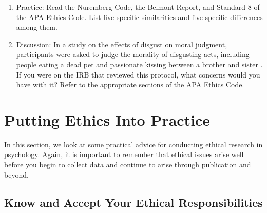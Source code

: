 \begin{fullwidth}

\begin{enumerate}

\item Practice: Read the Nuremberg Code, the Belmont Report, and Standard 8 of the APA Ethics Code. List five specific similarities and five specific differences among them.

\item Discussion: In a study on the effects of disgust on moral judgment, participants were asked to judge the morality of disgusting acts, including people eating a dead pet and passionate kissing between a brother and sister \citep{haidt_affect_1993}. If you were on the IRB that reviewed this protocol, what concerns would you have with it? Refer to the appropriate sections of the APA Ethics Code.

\end{enumerate}

\end{fullwidth}  

\newpage
\section{Putting Ethics Into Practice}

 
In this section, we look at some practical advice for conducting ethical research in psychology. Again, it is important to remember that ethical issues arise well before you begin to collect data and continue to arise through publication and beyond.

\subsection{Know and Accept Your Ethical Responsibilities}


